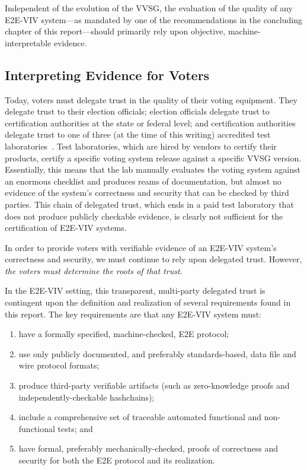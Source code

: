 Independent of the evolution of the VVSG, the evaluation of the
quality of any E2E-VIV system---as mandated by one of the
recommendations in the concluding chapter of this report---should
primarily rely upon objective, machine-interpretable evidence.

\subsection{Interpreting Evidence for Voters}

Today, voters must delegate trust in the quality of their voting
equipment.  They delegate trust to their election officials; election
officials delegate trust to certification authorities at the state or
federal level; and certification authorities delegate trust to one of
three (at the time of this writing) accredited test
laboratories~\cite{VVSG-labs}.  Test laboratories, which are hired by
vendors to certify their products, certify a specific voting system
release against a specific VVSG version. Essentially, this means that
the lab manually evaluates the voting system against an enormous
checklist and produces reams of documentation, but almost no evidence
of the system's correctness and security that can be checked by third
parties. This chain of delegated trust, which ends in a paid test
laboratory that does not produce publicly checkable evidence, is
clearly not sufficient for the certification of E2E-VIV systems.

In order to provide voters with verifiable evidence of an E2E-VIV
system's correctness and security, we must continue to rely upon
delegated trust. However, \emph{the voters must determine the roots of
  that trust}.

In the E2E-VIV setting, this transparent, multi-party delegated trust
is contingent upon the definition and realization of several
requirements found in this report.  The key requirements are that any
E2E-VIV system must:
\begin{enumerate}
\item have a formally specified, machine-checked, E2E protocol;
\item use only publicly documented, and preferably standards-based,
  data file and wire protocol formats;
\item produce third-party verifiable artifacts (such as zero-knowledge
  proofs and independently-checkable hashchains);
\item include a comprehensive set of traceable automated functional
  and non-functional tests; and
\item have formal, preferably mechanically-checked, proofs of
  correctness and security for both the E2E protocol and its
  realization.
\end{enumerate}

